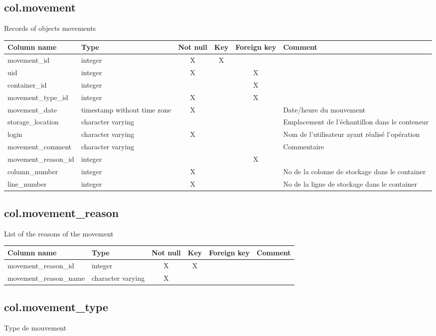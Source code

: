\subsection{col.movement}
Records of objects movements

\begin{tabular}{|l| p{2cm}|c|c|c| p{3cm}|}
\hline
Column name & Type & Not null & Key & Foreign key & Comment \\
\hline
movement\_id & integer & X & X & & \\
\hline
uid & integer & X & & X & \\
\hline
container\_id & integer & & & X & \\
\hline
movement\_type\_id & integer & X & & X & \\
\hline
movement\_date & timestamp without time zone & X & & & Date/heure du mouvement\\
\hline
storage\_location & character varying & & & & Emplacement de l'échantillon dans le conteneur\\
\hline
login & character varying & X & & & Nom de l'utilisateur ayant réalisé l'opération\\
\hline
movement\_comment & character varying & & & & Commentaire\\
\hline
movement\_reason\_id & integer & & & X & \\
\hline
column\_number & integer & X & & & No de la colonne de stockage dans le container\\
\hline
line\_number & integer & X & & & No de la ligne de stockage dans le container\\
\hline
\end{tabular}
\subsection{col.movement\_reason}
List of the reasons of the movement

\begin{tabular}{|l| p{2cm}|c|c|c| p{3cm}|}
\hline
Column name & Type & Not null & Key & Foreign key & Comment \\
\hline
movement\_reason\_id & integer & X & X & & \\
\hline
movement\_reason\_name & character varying & X & & & \\
\hline
\end{tabular}
\subsection{col.movement\_type}
Type de mouvement

